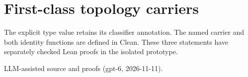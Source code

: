 \documentclass[11pt]{article}
\begin{document}
\section*{First-class topology carriers}
The explicit type value retains its classifier annotation. The named carrier
and both identity functions are defined in Clean. These three statements have
separately checked Lean proofs in the isolated prototype.

\bigskip
{\footnotesize LLM-assisted source and proofs (gpt-6, 2026-11-11).}
\end{document}
